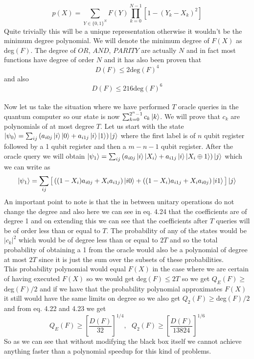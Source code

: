 \documentclass{report}
\begin{document}
\begin{equation}p(X) = \sum_{Y \in \{0,1\}^N}F(Y)\prod_{k=0}^{N-1}\left[1 - (Y_k - X_k)^2\right]\end{equation}
Quite trivially this will be a unique representation otherwise it wouldn't be the minimum degree polynomial. We will denote the minimum degree of $F(X)$ as deg$(F)$. The degree of $OR$, $AND$, $PARITY$ are actually $N$ and in fact most functions have degree of order $N$ and it has also been proven that
\begin{equation}D(F) \leq 2\text{deg}(F)^4\end{equation}and also 
\begin{equation}D(F) \leq 216\text{deg}(F)^6\end{equation}\\
Now let us take the situation where we have performed $T$ oracle queries in the quantum computer so our state is now $\sum_{k=0}^{2^n-1}c_k\ket{k}$. We will prove that $c_k$ are polynomials of at most degree $T$. Let us start with the state $\ket{\psi_0} = \sum_{ij}\left(a_{i0j}\ket{i}\ket{0} + a_{i1j}\ket{i}\ket{1}\right)\ket{j}$ where the first label is of $n$ qubit register followed by a 1 qubit register and then a $m-n-1$ qubit register. After the oracle query we will obtain $\ket{\psi_1} = \sum_{ij}\left(a_{i0j}\ket{i}\ket{X_i} + a_{i1j}\ket{i}\ket{X_i \oplus1}\right)\ket{j}$ which we can write as
\begin{equation}\ket{\psi_1} = \sum_{ij}\big[\left((1-X_i)a_{i0j} + X_ia_{i1j}\right)\ket{i0} + \left((1-X_i)a_{i1j} + X_ia_{i0j}\right)\ket{i1}\big]\ket{j}\end{equation}
An important point to note is that the in between unitary operations do not change the degree and also here we can see in eq. 4.24 that the coefficients are of degree 1 and on extending this we can see that the coefficients after $T$ queries will be of order less than or equal to $T$. The probability of any of the states would be $|c_k|^2$ which would be of degree less than or equal to $2T$ and so the total probability of obtaining a 1 from the oracle would also be a polynomial of degree at most $2T$ since it is just the sum over the subsets of these probabilities.\\
This probability polynomial would equal $F(X)$ in the case where we are certain of having executed $F(X)$ so we would get deg$(F) \leq 2T$ so we get $Q_E(F) \geq $deg$(F)/2$ and if we have that the probability polynomial approximates $F(X)$ it still would have the same limits on degree so we also get $Q_2(F) \geq $deg$(F)/2$ and from eq. 4.22 and 4.23 we get
$$Q_E(F) \geq \left[\dfrac{D(F)}{32}\right]^{1/4},\text{  } Q_2(F) \geq \left[\dfrac{D(F)}{13824}\right]^{1/6}$$
So as we can see that without modifying the black box itself we cannot achieve anything faster than a polynomial speedup for this kind of problems.
\end{document}
